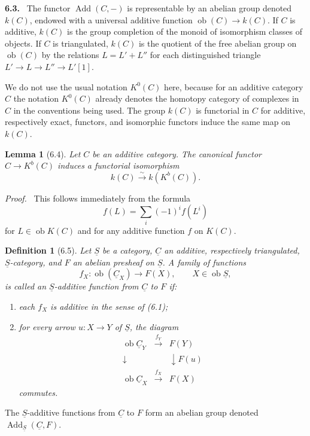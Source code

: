 \documentclass[13pt]{extarticle}
\newcommand{\uS}{\underline S}
\newcommand{\uC}{\underline C}
\newcommand{\ob}{\operatorname{ob}}
\newcommand{\Add}{\operatorname{Add}}
\newcommand{\iso}{\xrightarrow{\sim}}
\newenvironment{statement}[1]{\par\medskip\noindent\textbf{#1.}\ }{\par\medskip}
\newenvironment{prooftext}[1][Proof]{\par\noindent\emph{#1.}\ }{\par\medskip}
\newtheorem*{lemma*}{Lemma}
\newtheorem*{definition*}{Definition}
\begin{document}
\begin{statement}{6.3}
The functor $\Add(C,-)$ is representable by an abelian group denoted $k(C)$, endowed with a universal additive function $\ob(C)\to k(C)$. If $C$ is additive, $k(C)$ is the group completion of the monoid of isomorphism classes of objects. If $C$ is triangulated, $k(C)$ is the quotient of the free abelian group on $\ob(C)$ by the relations $L=L'+L''$ for each distinguished triangle $L'\to L\to L''\to L'[1]$.

We do not use the usual notation $K^0(C)$ here, because for an additive category $C$ the notation $K^0(C)$ already denotes the homotopy category of complexes in $C$ in the conventions being used. The group $k(C)$ is functorial in $C$ for additive, respectively exact, functors, and isomorphic functors induce the same map on $k(C)$.
\end{statement}

\begin{lemma*}[6.4]
Let $C$ be an additive category. The canonical functor $C\to K^b(C)$ induces a functorial isomorphism
\[
k(C)\iso k(K^b(C)).
\]
\end{lemma*}

\begin{prooftext}
This follows immediately from the formula
\[
f(L)=\sum_i(-1)^i f(L^i)
\tag{6.4.1}
\]
for $L\in\ob K(C)$ and for any additive function $f$ on $K(C)$.
\end{prooftext}

\begin{definition*}[6.5]
Let $\uS$ be a category, $\uC$ an additive, respectively triangulated, $\uS$-category, and $F$ an abelian presheaf on $\uS$. A family of functions
\[
f_X:\ob(\uC_X)\longrightarrow F(X),\qquad X\in\ob\uS,
\]
is called an \emph{$\uS$-additive function} from $\uC$ to $F$ if:
\begin{enumerate}[label=(\roman*)]
\item each $f_X$ is additive in the sense of (6.1);
\item for every arrow $u:X\to Y$ of $\uS$, the diagram
\[
\begin{array}{ccc}
\ob\uC_Y&\xrightarrow{f_Y}&F(Y)\\
\downarrow&&\downarrow F(u)\\
\ob\uC_X&\xrightarrow{f_X}&F(X)
\end{array}
\]
commutes.
\end{enumerate}
\end{definition*}

The $\uS$-additive functions from $\uC$ to $F$ form an abelian group denoted $\Add_{\uS}(\uC,F)$.
\end{document}
